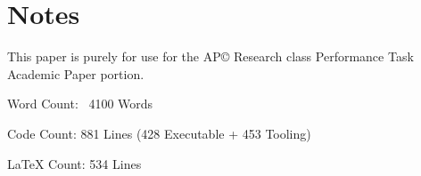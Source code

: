 \section*{Notes}
This paper is purely for use for the AP© Research class Performance Task Academic Paper portion.

Word Count: ~4100 Words

Code Count: 881 Lines (428 Executable + 453 Tooling)

LaTeX Count: 534 Lines
